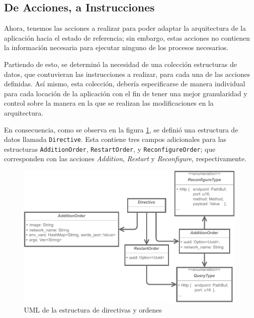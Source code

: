 \subsection{De Acciones, a Instrucciones}

Ahora, tenemos las acciones a realizar para poder adaptar la arquitectura de la aplicación hacia el estado de referencia; sin embargo, estas acciones no contienen la información necesaria para ejecutar ninguno de los procesos necesarios.

Partiendo de esto, se determinó la necesidad de una colección estructuras de datos, que contuvieran las instrucciones a realizar, para cada una de las acciones definidas. Así mismo, esta colección, debería especificarse de manera individual para cada locación de la aplicación con el fin de tener una mejor granularidad y control sobre la manera en la que se realizan las modificaciones en la arquitectura.

En consecuencia, como se observa en la figura \ref{fig:Directives}, se definió una estructura de datos llamada \texttt{Directive}. Esta contiene tres campos adicionales para las estructuras \texttt{AdditionOrder}, \texttt{RestartOrder}, y \texttt{ReconfigureOrder}; que corresponden con las acciones \textit{Addition}, \textit{Restart} y \textit{Reconfigure}, respectivamente.

\begin{figure}[ht]
    \centering
    \caption{UML de la estructura de directivas y ordenes}
    \label{fig:Directives}
    \includegraphics[width=0.8\linewidth]{images/Directives.pdf}
\end{figure}

